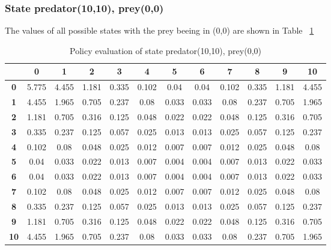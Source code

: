 \documentclass[11pt]{article}
\begin{document}
\subsubsection{State predator(10,10), prey(0,0)}

The values of all possible states with the prey beeing in (0,0) are shown in Table ~\ref{state4}

\begin{center}
\begin{table}[ht]
{\small
\hfill{}
\begin{tabular}{c|c|c|c|c|c|c|c|c|c|c|c}
\textbf{} & \textbf{0} & \textbf{1} & \textbf{2} & \textbf{3} & \textbf{4} & \textbf{5} & \textbf{6} & \textbf{7} & \textbf{8} & \textbf{9} & \textbf{10}\\
	\hline
\textbf{0}& 5.775	& 4.455	& 1.181	& 0.335	& 0.102	& 0.04	& 0.04	& 0.102	& 0.335	& 1.181	& 4.455	\\
\textbf{1}& 4.455	& 1.965	& 0.705	& 0.237	& 0.08	& 0.033	& 0.033	& 0.08	& 0.237	& 0.705	& 1.965	\\
\textbf{2}& 1.181	& 0.705	& 0.316	& 0.125	& 0.048	& 0.022	& 0.022	& 0.048	& 0.125	& 0.316	& 0.705	\\
\textbf{3}& 0.335	& 0.237	& 0.125	& 0.057	& 0.025	& 0.013	& 0.013	& 0.025	& 0.057	& 0.125	& 0.237	\\
\textbf{4}& 0.102	& 0.08	& 0.048	& 0.025	& 0.012	& 0.007	& 0.007	& 0.012	& 0.025	& 0.048	& 0.08	\\
\textbf{5}& 0.04	& 0.033	& 0.022	& 0.013	& 0.007	& 0.004	& 0.004	& 0.007	& 0.013	& 0.022	& 0.033	\\
\textbf{6}& 0.04	& 0.033	& 0.022	& 0.013	& 0.007	& 0.004	& 0.004	& 0.007	& 0.013	& 0.022	& 0.033	\\
\textbf{7}& 0.102	& 0.08	& 0.048	& 0.025	& 0.012	& 0.007	& 0.007	& 0.012	& 0.025	& 0.048	& 0.08	\\
\textbf{8}& 0.335	& 0.237	& 0.125	& 0.057	& 0.025	& 0.013	& 0.013	& 0.025	& 0.057	& 0.125	& 0.237	\\
\textbf{9}& 1.181	& 0.705	& 0.316	& 0.125	& 0.048	& 0.022	& 0.022	& 0.048	& 0.125	& 0.316	& 0.705	\\
\textbf{10}& 4.455	& 1.965	& 0.705	& 0.237	& 0.08	& 0.033	& 0.033	& 0.08	& 0.237	& 0.705	& 1.965	\\
\end{tabular}}
\hfill{}
\caption{Policy evaluation of state predator(10,10), prey(0,0)}
\label{state4}
\end{table}
\end{center}	
\end{document}
